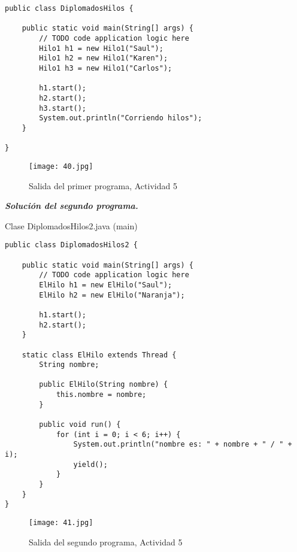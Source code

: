 \begin{verbatim}
public class DiplomadosHilos {

    public static void main(String[] args) {
        // TODO code application logic here
        Hilo1 h1 = new Hilo1("Saul");
        Hilo1 h2 = new Hilo1("Karen");
        Hilo1 h3 = new Hilo1("Carlos");
        
        h1.start();
        h2.start();
        h3.start();
        System.out.println("Corriendo hilos");
    }
    
}
\end{verbatim} \vspace{1cm}
\begin{figure}[h!]
		\centering
		{\texttt{[image: 40.jpg]}\par} 
		\caption{Salida del primer programa, Actividad 5}\vspace{1cm}
\end{figure}

\textbf{\textit{Solución del segundo programa.}}

\begin{center}
Clase DiplomadosHilos2.java (main)
\end{center}

\begin{verbatim}
public class DiplomadosHilos2 {

    public static void main(String[] args) {
        // TODO code application logic here
        ElHilo h1 = new ElHilo("Saul");
        ElHilo h2 = new ElHilo("Naranja");
        
        h1.start();
        h2.start();
    }

    static class ElHilo extends Thread {
        String nombre;

        public ElHilo(String nombre) {
            this.nombre = nombre;
        }

        public void run() {
            for (int i = 0; i < 6; i++) {
                System.out.println("nombre es: " + nombre + " / " + i);
                yield();
            }
        }
    }
}
\end{verbatim} \vspace{1cm}
\begin{figure}[h!]
		\centering
		{\texttt{[image: 41.jpg]}\par} 
		\caption{Salida del segundo programa, Actividad 5}\vspace{1cm}
\end{figure}

